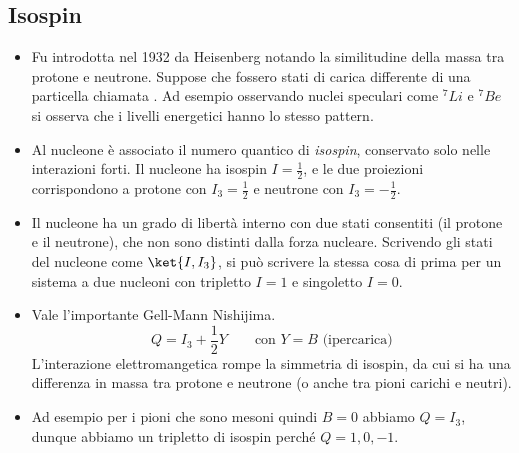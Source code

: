 \subsection{Isospin}
\begin{itemize}
\item Fu introdotta nel 1932 da Heisenberg notando la similitudine della massa tra protone e neutrone. Suppose che fossero stati di carica differente di una particella chiamata . Ad esempio osservando nuclei speculari come $^7Li$ e $^7Be$ si osserva che i livelli energetici hanno lo stesso pattern.
\item Al nucleone è associato il numero quantico di \textit{isospin}, conservato solo nelle interazioni forti. Il nucleone ha isospin $I=\frac12$, e le due proiezioni corrispondono a protone con $I_3=\frac12$ e neutrone con $I_3=-\frac12$.
\item Il nucleone ha un grado di libertà interno con due stati consentiti (il protone e il neutrone), che non sono distinti dalla forza nucleare. Scrivendo gli stati del nucleone come $\ket{I,I_3}$, si può scrivere la stessa cosa di prima per un sistema a due nucleoni con tripletto $I=1$ e singoletto $I=0$.
\item Vale l'importante Gell-Mann Nishijima.
\begin{equation*}
Q=I_3+\frac12 Y\qquad\text{con }Y=B\text{ (ipercarica)}
\end{equation*}
L'interazione elettromangetica rompe la simmetria di isospin, da cui si ha una differenza in massa tra protone e neutrone (o anche tra pioni carichi e neutri).
\item Ad esempio per i pioni che sono mesoni quindi $B=0$ abbiamo $Q=I_3$, dunque abbiamo un tripletto di isospin perché $Q=1,0,-1$.
\end{itemize}
